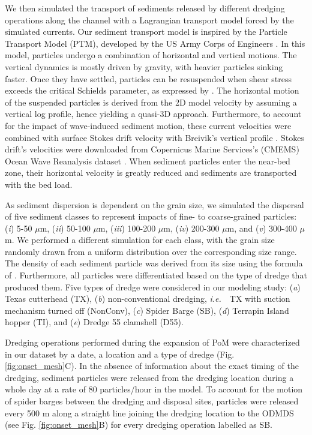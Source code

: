\documentclass[preprint,12pt,authoryear]{elsarticle}
\newcommand{\ie}{{\it i.e.}\ }
\begin{document}
We then simulated the transport of sediments released by different dredging operations along the channel with a Lagrangian transport model forced by the simulated currents. Our sediment transport model is inspired by the Particle Transport Model (PTM), developed by the US Army Corps of Engineers \citep{macdonald2006ptm}. In this model, particles undergo a combination of horizontal and vertical motions. The vertical dynamics is mostly driven by gravity, with heavier particles sinking faster. Once they have settled, particles can be resuspended when shear stress exceeds the critical Schields parameter, as expressed by \cite{soulsby1997threshold}. The horizontal motion of the suspended particles is derived from the 2D model velocity by assuming a vertical log profile, hence yielding a quasi-3D approach. Furthermore, to account for the impact of wave-induced sediment motion, these current velocities were combined with surface Stokes drift velocity with Breivik's vertical profile \citep{breivik2016stokes}. Stokes drift's velocities were downloaded from Copernicus Marine Services's (CMEMS) Ocean Wave Reanalysis dataset \citep{cmems}. When sediment particles enter the near-bed zone, their horizontal velocity is greatly reduced and sediments are transported with the bed load.

As sediment dispersion is dependent on the grain size, we simulated the dispersal of five sediment classes to represent impacts of fine- to coarse-grained particles: (\textit{i}) 5-50 $\mu$m, (\textit{ii}) 50-100 $\mu$m, (\textit{iii}) 100-200 $\mu$m, (\textit{iv}) 200-300 $\mu$m, and (\textit{v}) 300-400 $\mu$m. We performed a  different simulation for each class, with the grain size randomly drawn from a uniform distribution over the corresponding size range. The density of each sediment particle was derived from its size using the formula of \cite{hamilton1982sound}. Furthermore, all particles were differentiated based on the type of dredge that produced them. Five types of dredge were considered in our modeling study: (\textit{a}) Texas cutterhead (TX), (\textit{b}) non-conventional dredging, \ie~TX with suction mechanism turned off (NonConv), (\textit{c}) Spider Barge (SB), (\textit{d}) Terrapin Island hopper (TI), and (\textit{e}) Dredge 55 clamshell (D55).

Dredging operations performed during the expansion of PoM were characterized in our dataset by a date, a location and a type of dredge (Fig. \ref{fig:onset_mesh}C). In the absence of information about the exact timing of the dredging, sediment particles were released from the dredging location during a whole day at a rate of 80 particles/hour in the model. To account for the motion of spider barges between the dredging and disposal sites, particles were released every 500 m along a straight line joining the dredging location to the ODMDS (see Fig. \ref{fig:onset_mesh}B) for every dredging operation labelled as SB.
\end{document}
